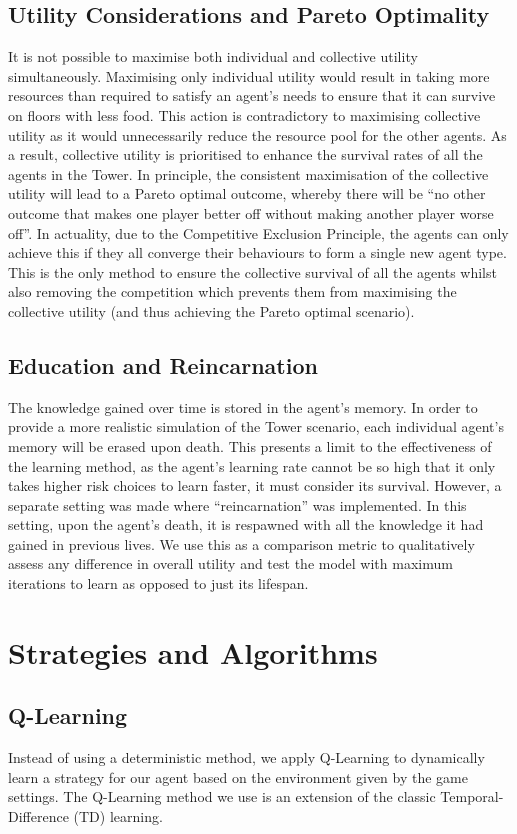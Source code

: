 \subsection{Utility Considerations and Pareto Optimality}
It is not possible to maximise both individual and collective utility simultaneously. Maximising only individual utility would result in taking more resources than required to satisfy an agent’s needs to ensure that it can survive on floors with less food. This action is contradictory to maximising collective utility as it would unnecessarily reduce the resource pool for the other agents. As a result, collective utility is prioritised to enhance the survival rates of all the agents in the Tower. In principle, the consistent maximisation of the collective utility will lead to a Pareto optimal outcome, whereby there will be “no other outcome that makes one player better off without making another player worse off”. In actuality, due to the Competitive Exclusion Principle, the agents can only achieve this if they all converge their behaviours to form a single new agent type. This is the only method to ensure the collective survival of all the agents whilst also removing the competition which prevents them from maximising the collective utility (and thus achieving the Pareto optimal scenario). 
\subsection{Education and Reincarnation}
The knowledge gained over time is stored in the agent’s memory. In order to provide a more realistic simulation of the Tower scenario, each individual agent’s memory will be erased upon death. This presents a limit to the effectiveness of the learning method, as the agent’s learning rate cannot be so high that it only takes higher risk choices to learn faster, it must consider its survival. However, a separate setting was made where “reincarnation” was implemented. In this setting, upon the agent’s death, it is respawned with all the knowledge it had gained in previous lives. We use this as a comparison metric to qualitatively assess any difference in overall utility and test the model with maximum iterations to learn as opposed to just its lifespan.
\section{Strategies and Algorithms}
\subsection{Q-Learning}
Instead of using a deterministic method, we apply Q-Learning to dynamically learn a strategy for our agent based on the environment given by the game settings. The Q-Learning method we use is an extension of the classic Temporal-Difference (TD) learning.
